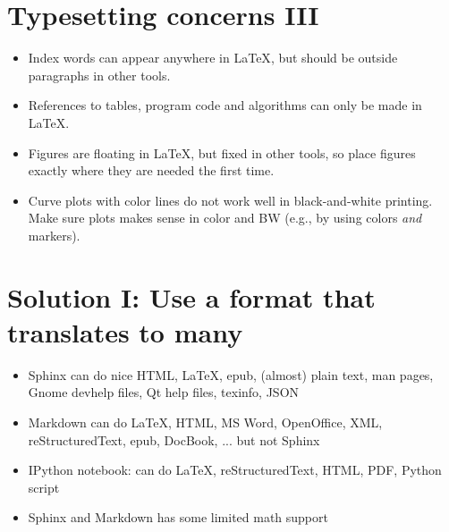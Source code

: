 \documentclass[%
twoside,                 %
final,                   %
chapterprefix=true,      %
open=right               %
10pt]{book}
\begin{document}
\noindent


\section*{Typesetting concerns III}

\begin{itemize}
 \item Index words can appear anywhere in {\LaTeX}, but should be outside
   paragraphs in other tools.

 \item References to tables, program code and algorithms can only be
   made in {\LaTeX}.

 \item Figures are floating in {\LaTeX}, but fixed in other tools, so place
   figures exactly where they are needed the first time.

 \item Curve plots with color lines do not work well in black-and-white
   printing. Make sure plots makes sense in color and BW (e.g., by
   using colors \emph{and} markers).
\end{itemize}

\noindent

\section*{Solution I: Use a format that translates to many}

\begin{itemize}
 \item Sphinx can do nice HTML, {\LaTeX}, epub, (almost) plain text,
   man pages, Gnome devhelp files, Qt help files, texinfo, JSON

 \item Markdown can do {\LaTeX}, HTML, MS Word, OpenOffice, XML,
   reStructuredText, epub, DocBook, ... but not Sphinx

 \item IPython notebook: can do {\LaTeX}, reStructuredText, HTML, PDF,
   Python script

 \item Sphinx and Markdown has some limited math support
\end{itemize}
\end{document}
